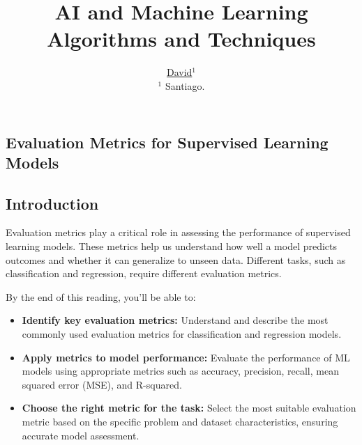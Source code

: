 \documentclass[11pt,spanish]{article}
\title{\vspace{-5mm}\fontsize{16pt}{10pt}\selectfont \textbf{AI and Machine Learning Algorithms and Techniques}} %
\author{
\normalsize \underline{David}$^{1}$
 \\ \vspace{-1mm}
\small  $^1$ Santiago. }
\date{}
\begin{document}
\maketitle
\thispagestyle{fancy} %


\begin{multicols}{2}

\setlength{\parskip}{2mm}
\setlength{\intextsep}{0pt} 



\section{Evaluation Metrics for Supervised Learning Models}

\subsection{Introduction}
Evaluation metrics play a critical role in assessing the performance of supervised learning models. These metrics help us understand how well a model predicts outcomes and whether it can generalize to unseen data. Different tasks, such as classification and regression, require different evaluation metrics.

By the end of this reading, you’ll be able to:
\begin{itemize}
    \item \textbf{Identify key evaluation metrics:} Understand and describe the most commonly used evaluation metrics for classification and regression models.
    \item \textbf{Apply metrics to model performance:} Evaluate the performance of ML models using appropriate metrics such as accuracy, precision, recall, mean squared error (MSE), and R-squared.
    \item \textbf{Choose the right metric for the task:} Select the most suitable evaluation metric based on the specific problem and dataset characteristics, ensuring accurate model assessment.
\end{itemize}


\end{multicols}
\end{document}
